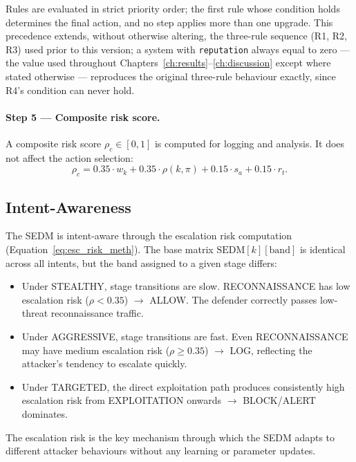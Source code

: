 Rules are evaluated in strict priority order; the first rule whose condition
holds determines the final action, and no step applies more than one
upgrade. This precedence extends, without otherwise altering, the
three-rule sequence (R1, R2, R3) used prior to this version; a system with
\texttt{reputation} always equal to zero — the value used throughout
Chapters~\ref{ch:results}--\ref{ch:discussion} except where stated otherwise —
reproduces the original three-rule behaviour exactly, since R4's condition
can never hold.

\paragraph{Step 5 — Composite risk score.}
A composite risk score $\rho_c \in [0, 1]$ is computed for logging and
analysis.
It does not affect the action selection:
%
\begin{equation}
  \rho_c = 0.35 \cdot w_k
         + 0.35 \cdot \rho(k, \pi)
         + 0.15 \cdot s_a
         + 0.15 \cdot r_t.
  \label{eq:composite_risk}
\end{equation}

\subsection{Intent-Awareness}

The SEDM is intent-aware through the escalation risk computation
(Equation~\ref{eq:esc_risk_meth}).
The base matrix $\text{SEDM}[k][\text{band}]$ is identical across all
intents, but the band assigned to a given stage differs:
%
\begin{itemize}
  \item Under STEALTHY, stage transitions are slow.
        RECONNAISSANCE has low escalation risk ($\rho < 0.35$) $\to$ ALLOW.
        The defender correctly passes low-threat reconnaissance traffic.
  \item Under AGGRESSIVE, stage transitions are fast.
        Even RECONNAISSANCE may have medium escalation risk ($\rho \geq 0.35$)
        $\to$ LOG, reflecting the attacker's tendency to escalate quickly.
  \item Under TARGETED, the direct exploitation path produces consistently
        high escalation risk from EXPLOITATION onwards $\to$ BLOCK/ALERT
        dominates.
\end{itemize}

The escalation risk is the key mechanism through which the SEDM adapts to
different attacker behaviours without any learning or parameter updates.

